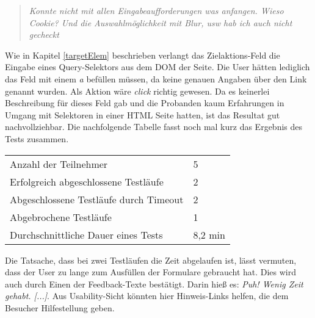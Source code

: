 \vspace{0.3cm}
\begin{quote}
     \glqq \textit{Konnte nicht mit allen Eingabeaufforderungen was anfangen.
    Wieso Cookie? Und die Auswahlmöglichkeit mit Blur, usw hab ich auch nicht gecheckt}\grqq{}
\end{quote}
\vspace{0.3cm}

Wie in Kapitel \ref{targetElem} beschrieben verlangt das Zielaktions-Feld die Eingabe eines Query-Selektors aus dem DOM der Seite. Die User hätten lediglich das Feld mit einem \glqq \textit{a}\grqq{} befüllen müssen, da keine genauen Angaben über den Link genannt wurden. Als Aktion wäre \glqq \textit{click}\grqq{} richtig gewesen. Da es keinerlei Beschreibung für dieses Feld gab und die Probanden kaum Erfahrungen in Umgang mit Selektoren in einer HTML Seite hatten, ist das Resultat gut nachvollziehbar. Die nachfolgende Tabelle fasst noch mal kurz das Ergebnis des Tests zusammen.
\\
\begin{center}
{\footnotesize
\begin{tabular}{ p{6.5cm} p{1.1cm} }
  \hline
  Anzahl der Teilnehmer & 5\vspace{0.2cm}\\
  Erfolgreich abgeschlossene Testläufe & 2\vspace{0.2cm}\\
  Abgeschlossene Testläufe durch Timeout & 2\vspace{0.2cm}\\
  Abgebrochene Testläufe & 1\vspace{0.2cm}\\
  Durchschnittliche Dauer eines Tests & 8,2 min\\
  \hline
\end{tabular}
}
\vspace{0.3cm}
 \label{tab:title}
\vspace{0.3cm}
\end{center}

Die Tatsache, dass bei zwei Testläufen die Zeit abgelaufen ist, lässt vermuten, dass der User zu lange zum Ausfüllen der Formulare gebraucht hat. Dies wird auch durch Einen der Feedback-Texte bestätigt. Darin hieß es: \glqq \textit{Puh! Wenig Zeit gehabt. [...]}\grqq{}. Aus Usability-Sicht könnten hier Hinweis-Links helfen, die dem Besucher Hilfestellung geben.